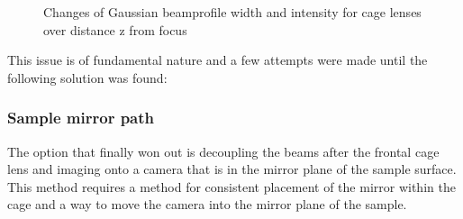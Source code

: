 \documentclass[twoside,openright]{scrreprt}
\begin{document}
\begin{figure}[h]
\begin{subfigure}[t]{\textwidth}
\end{subfigure}
\caption{Changes of Gaussian beamprofile width and intensity for cage lenses over distance z from focus\label{fig:beamWaistCompendium}}
\end{figure}

This issue is of fundamental nature and a few attempts were made until the following solution was found:

\subsubsection{Sample mirror path}\label{SampleMirrorCamera}
The option that finally won out is decoupling the beams after the frontal cage lens and imaging onto a camera that is in the mirror plane of the sample surface. This method requires a method for consistent placement of the mirror within the cage and a way to move the camera into the mirror plane of the sample.\\
\end{document}
